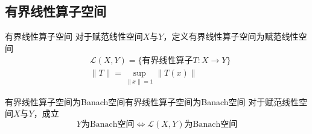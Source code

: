 \documentclass[lang = cn, scheme = chinese, thmcnt = section]{elegantbook}
\begin{document}
\subsection{有界线性算子空间}

\begin{definition}{有界线性算子空间}
	对于赋范线性空间$X$与$Y$，定义有界线性算子空间为赋范线性空间
	\begin{align*}
		&\mathcal{L}(X,Y)=\{ \text{有界线性算子}T:X\to Y \}\\
		&\|T\|=\sup_{\|x\|=1}\|T(x)\|
	\end{align*}
\end{definition}

\begin{theorem}{有界线性算子空间为Banach空间}{有界线性算子空间为Banach空间}
	对于赋范线性空间$X$与$Y$，成立
	$$
	Y\text{为Banach空间}\iff \mathcal{L}(X,Y)\text{为Banach空间}
	$$
\end{theorem}
\end{document}
